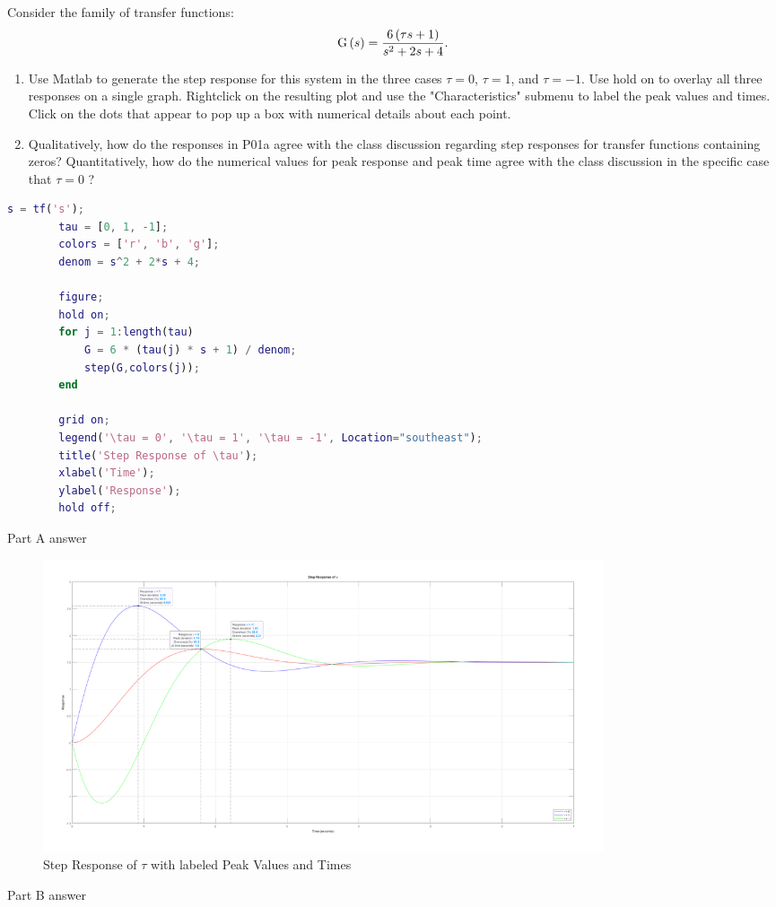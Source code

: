 \begin{hwkProblem}{1}{}

	Consider the family of transfer functions: \[ \func{G}[s] = \frac{6 \left(\tau s + 1\right)}{s^{2} + 2s + 4}. \]
	\begin{enumerate}
		\item Use Matlab to generate the step response for this system in the three cases \(\tau=0\), \(\tau=1\), and \(\tau=-1\). Use hold on to overlay all three responses on a single graph. Rightclick on the resulting plot and use the "Characteristics" submenu to label the peak values and times. Click on the dots that appear to pop up a box with numerical details about each point.
		\item Qualitatively, how do the responses in P01a agree with the class discussion regarding step responses for transfer functions containing zeros? Quantitatively, how do the numerical values for peak response and peak time agree with the class discussion in the specific case that \(\tau=0\) ?
	\end{enumerate}

	\hwkSol{}

	\begin{lstlisting}[language={matlab}, label={lst:s01}, caption={MATLAB code for HW05 P01}]
		s = tf('s');
		tau = [0, 1, -1];
		colors = ['r', 'b', 'g'];
		denom = s^2 + 2*s + 4;

		figure;
		hold on;
		for j = 1:length(tau)
			G = 6 * (tau(j) * s + 1) / denom;
			step(G,colors(j));
		end

		grid on;
		legend('\tau = 0', '\tau = 1', '\tau = -1', Location="southeast");
		title('Step Response of \tau');
		xlabel('Time');
		ylabel('Response');
		hold off;
	\end{lstlisting}

	\hwkPart{}

	Part A answer

	\begin{figure}[H]
		\begin{center}
			\includegraphics[width=0.8\textwidth]{./images/s01a.png}
		\end{center}
		\caption{Step Response of \( \tau \) with labeled Peak Values and Times}\label{fig:s01a}
	\end{figure}

	\hwkPart{}

	Part B answer

\end{hwkProblem}

